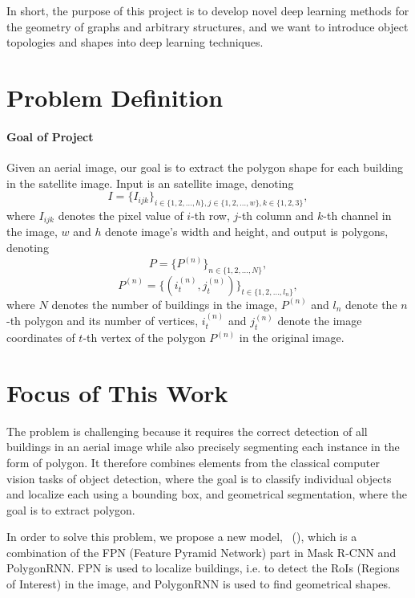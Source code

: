 In short, the purpose of this project is to develop novel deep learning methods for the geometry of graphs and arbitrary structures, and we want to introduce object topologies and shapes into deep learning techniques.

\section{Problem Definition}\label{prodef}

\paragraph{Goal of Project} Given an aerial image, our goal is to extract the polygon shape for each building in the satellite image. Input is an satellite image, denoting 
\begin{equation}
I = \{I_{ijk}\}_{i \in \{1,2,\ldots,h\}, j \in \{1,2,\ldots,w\}, k \in \{1,2,3\}},
\end{equation}
where $I_{ijk}$ denotes the pixel value of $i$-th row, $j$-th column and $k$-th channel in the image, $w$ and $h$ denote image's width and height, and output is polygons, denoting
\begin{equation}
P = \{P^{(n)}\}_{n \in \{1,2,\ldots,N\}},
\end{equation}
\begin{equation}
P^{(n)} = \{(i^{(n)}_t, j^{(n)}_t)\}_{t \in \{1,2,\ldots,l_n\}},
\end{equation}
where $N$ denotes the number of buildings in the image, $P^{(n)}$ and $l_n$ denote the $n$-th polygon and its number of vertices, $i^{(n)}_t$ and $j^{(n)}_t$ denote the image coordinates of $t$-th vertex of the polygon $P^{(n)}$ in the original image.

\section{Focus of This Work}\label{fcswrk}

The problem is challenging because it requires the correct detection of all buildings in an aerial image while also precisely segmenting each instance in the form of polygon. It therefore combines elements from the classical computer vision tasks of object detection, where the goal is to classify individual objects and localize each using a bounding box, and geometrical segmentation, where the goal is to extract polygon.

In order to solve this problem, we propose a new model, \modelnameshort\ (\modelnamelong), which is a combination of the FPN (Feature Pyramid Network) part in Mask R-CNN and PolygonRNN. FPN is used to localize buildings, i.e. to detect the RoIs (Regions of Interest) in the image, and PolygonRNN is used to find geometrical shapes.

